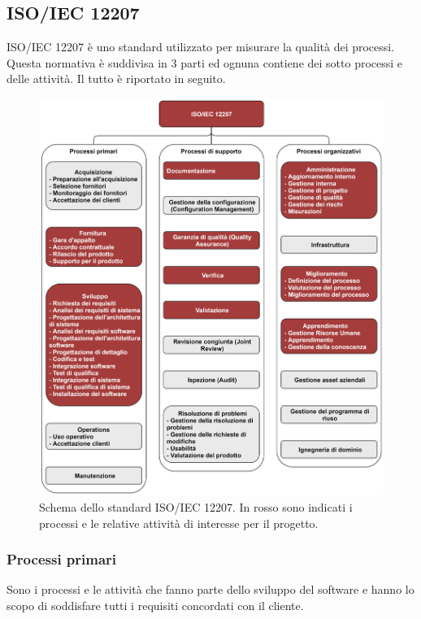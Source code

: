 \subsection{ISO/IEC 12207}
ISO/IEC 12207 è uno standard utilizzato per misurare la qualità dei processi. Questa normativa è suddivisa in 3 parti
ed ognuna contiene dei sotto processi e delle attività. Il tutto è riportato in seguito. 

\begin{figure}[h]
    \centering
    \includegraphics[scale=0.53]{sezioni/Immagini/Iso_Iec_12207.png}
    \caption{Schema dello standard ISO/IEC 12207. In rosso sono indicati i processi e le relative attività di interesse per il progetto.}
\end{figure}

\subsubsection{Processi primari}
Sono i processi e le attività che fanno parte dello sviluppo del software e hanno lo scopo di soddisfare tutti i requisiti concordati con il cliente.

